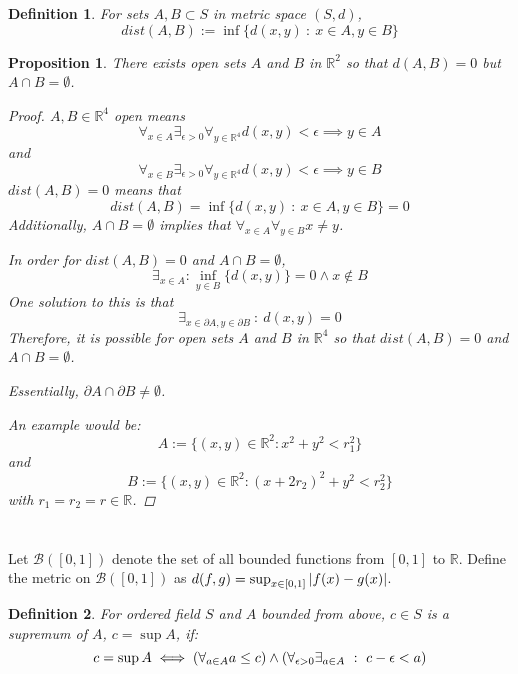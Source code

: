 \documentclass[]{article}
\newcommand{\R}{\mathbb{R}}
\newcommand{\st}{\ : \ }
\newtheorem{definition}{Definition}
\newtheorem{proposition}{Proposition}
\begin{document}
\begin{definition}
    For sets $A,B \subset S$ in metric space $(S,d)$, 
    \[dist(A,B) := \inf\{d(x,y) \st x \in A, y \in B\}\]
\end{definition}

\begin{proposition}
    There exists open sets $A$ and $B$ in $\R^2$ so that $d(A,B) = 0$ but $A \cap B = \emptyset$.
    \begin{proof}
        $A,B \in \R^4$ open means 
        \[
            \forall_{x \in A} \exists_{\epsilon>0} \forall_{y \in \R^4} d(x,y) < \epsilon \implies y \in A
        \]
        and 
        \[
            \forall_{x \in B} \exists_{\epsilon>0} \forall_{y \in \R^4} d(x,y) < \epsilon \implies y \in B
        \]
        $dist(A,B) = 0$ means that 
        \[dist(A,B) = \inf\{d(x,y) \st x \in A, y \in B\} = 0\]
        Additionally, $A \cap B = \emptyset$ implies that $\forall_{x \in A} \forall_{y \in B} x \neq y$.

        In order for $dist(A,B) = 0$ and $A \cap B = \emptyset$, 
        \[\exists_{x \in A} : \inf_{y \in B} \{d(x,y)\} = 0 \land x \notin B\]
        One solution to this is that
        \[\exists_{x \in \partial{A}, y \in \partial{B}} \st d(x,y) = 0\]
        Therefore, it is possible for open sets $A$ and $B$ in $\R^4$ so that $dist(A,B) = 0$ and $A \cap B = \emptyset$.

        Essentially, $\partial{A} \cap \partial{B} \neq \emptyset$.

        An example would be: 
        \[A := \{(x,y) \in \R^2 : x^2 + y^2 < r_1^2\}\]
        and 
        \[B := \{(x,y) \in \R^2: (x + 2r_2)^2 + y^2 < r_2^2\}\]
        with $r_1 = r_2 = r \in \R$.
    \end{proof}
\end{proposition}

\newpage
\section{}
Let $\mathcal{B}([0,1])$ denote the set of all bounded functions from $[0,1]$ to $\R$. Define the metric on $\mathcal{B}([0,1])$ as $d(f,g) = \sup_{x \in [0,1]} \abs{f(x) - g(x)}$.

\begin{definition}
    For  ordered field $S$ and $A$ bounded from above, $c \in S$ is a \emph{supremum} of $A$, 
    $c = \sup A$, if: 
    \[
        c = \sup A \iff 
            \qty(\forall_{a\in A} a \leq c) 
            \land \qty(\forall_{\epsilon>0} \exists_{a\in A} \st c - \epsilon < a)
    \]
\end{definition}
\end{document}
